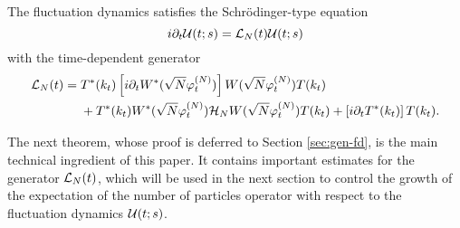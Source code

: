\documentclass[11pt,a4paper]{article}
\newcommand{\cU}{{\cal U}}
\newcommand{\cH}{{\cal H}}
\newcommand{\cL}{{\cal L}}
\begin{document}
The fluctuation dynamics satisfies the Schr\"odinger-type equation
\[ i\partial_t \cU (t;s) = \cL_N (t) \cU (t;s) \]
with the time-dependent generator
\[ \begin{split} \cL_N (t) = \; &T^* (k_t) \left[ i \partial_t W^* (\sqrt{N} \varphi_t^{(N)}) \right] W(\sqrt{N} \varphi_t^{(N)}) T (k_t) \\ &+ T^* (k_t) W^* (\sqrt{N} \varphi_t^{(N)}) \cH_N W (\sqrt{N} \varphi_t^{(N)}) T (k_t) + \left[ i \partial_t T^* (k_t) \right] T(k_t).  \end{split} \]

The next theorem, whose proof is deferred to Section \ref{sec:gen-fd}, is the main technical ingredient of this paper. It contains important estimates for the generator $\cL_N (t)$, which will be used in the next section to control the growth of the expectation of the number of particles operator with respect to the fluctuation dynamics $\cU (t;s)$. 
\end{document}
